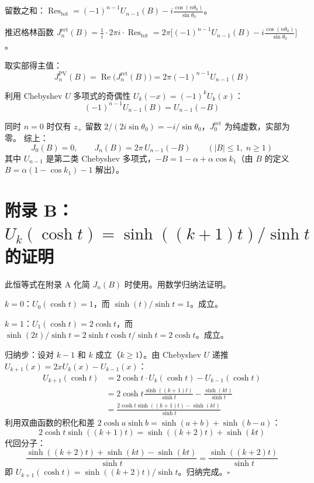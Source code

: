 \documentclass[12pt,a4paper]{ctexart}
\begin{document}
留数之和：$\operatorname{Res}_{\text{tot}}=(-1)^{n-1}U_{n-1}(B)-i\frac{\cos(n\theta_0)}{\sin\theta_0}$。

推迟格林函数 $J_n^{\text{ret}}(B)=\frac{1}{i}\cdot2\pi i\cdot\operatorname{Res}_{\text{tot}}
=2\pi\big[(-1)^{n-1}U_{n-1}(B)-i\frac{\cos(n\theta_0)}{\sin\theta_0}\big]$。

取实部得主值：
\begin{equation}
J_n^{\text{PV}}(B)=\operatorname{Re}\!\big(J_n^{\text{ret}}(B)\big)=2\pi(-1)^{n-1}U_{n-1}(B)
\end{equation}

利用 Chebyshev $U$ 多项式的奇偶性 $U_k(-x)=(-1)^kU_k(x)$：
\begin{equation}
(-1)^{n-1}U_{n-1}(B)=U_{n-1}(-B)
\end{equation}

同时 $n=0$ 时仅有 $z_+$ 留数 $2/(2i\sin\theta_0)=-i/\sin\theta_0$，$J_0^{\text{ret}}$ 为纯虚数，实部为零。
综上：
\begin{equation}
\boxed{J_0(B)=0,\qquad J_n(B)=2\pi\,U_{n-1}(-B)\qquad(|B|\leq1,\;n\geq1)}
\end{equation}
其中 $U_{n-1}$ 是第二类 Chebyshev 多项式，$-B=1-\alpha+\alpha\cos k_1$（由 $B$ 的定义 $B=\alpha(1-\cos k_1)-1$ 解出）。

\section{附录 B：$U_k(\cosh t)=\sinh((k+1)t)/\sinh t$ 的证明}
\label{app:Ucosh}

此恒等式在附录 A 化简 $J_n(B)$ 时使用。用数学归纳法证明。

$k=0$：$U_0(\cosh t)=1$，而 $\sinh(t)/\sinh t=1$。成立。

$k=1$：$U_1(\cosh t)=2\cosh t$，而 $\sinh(2t)/\sinh t=2\sinh t\cosh t/\sinh t=2\cosh t$。成立。

归纳步：设对 $k-1$ 和 $k$ 成立（$k\geq1$）。由 Chebyshev $U$ 递推 $U_{k+1}(x)=2xU_k(x)-U_{k-1}(x)$：
\begin{equation}
\begin{aligned}
U_{k+1}(\cosh t)
&=2\cosh t\cdot U_k(\cosh t)-U_{k-1}(\cosh t) \\[4pt]
&=2\cosh t\frac{\sinh((k+1)t)}{\sinh t}-\frac{\sinh(kt)}{\sinh t} \\[4pt]
&=\frac{2\cosh t\sinh((k+1)t)-\sinh(kt)}{\sinh t}
\end{aligned}
\end{equation}
利用双曲函数的积化和差 $2\cosh a\sinh b=\sinh(a+b)+\sinh(b-a)$：
\begin{equation}
2\cosh t\sinh((k+1)t)=\sinh((k+2)t)+\sinh(kt)
\end{equation}
代回分子：
\begin{equation}
\frac{\sinh((k+2)t)+\sinh(kt)-\sinh(kt)}{\sinh t}
=\frac{\sinh((k+2)t)}{\sinh t}
\end{equation}
即 $U_{k+1}(\cosh t)=\sinh((k+2)t)/\sinh t$。归纳完成。$\square$
\end{document}
